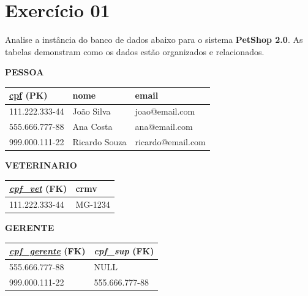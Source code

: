 \documentclass[12pt]{article}
\begin{document}
    
\vspace*{0.2cm}

\section*{Exercício 01}

Analise a instância do banco de dados abaixo para o sistema \textbf{PetShop 2.0}. As tabelas demonstram como os dados estão organizados e relacionados.

\begin{table}[H]
    \centering
    \small
    \textbf{PESSOA}\\
    \begin{tabular}{|l|l|l|}
    \hline
    \rowcolor{tableheader} \underline{cpf} (PK) & nome & email \\ \hline
    111.222.333-44 & João Silva & joao@email.com \\ \hline
    555.666.777-88 & Ana Costa & ana@email.com \\ \hline
    999.000.111-22 & Ricardo Souza & ricardo@email.com \\ \hline
    \end{tabular}

    \vspace{0.5cm}

    \begin{minipage}{0.45\textwidth}
        \centering
        \textbf{VETERINARIO}\\
        \begin{tabular}{|l|l|}
        \hline
        \rowcolor{tableheader} \underline{\textit{cpf\_vet}} (FK) & crmv \\ \hline
        111.222.333-44 & MG-1234 \\ \hline
        \end{tabular}
    \end{minipage}
    \begin{minipage}{0.45\textwidth}
        \centering
        \textbf{GERENTE}\\
        \begin{tabular}{|l|l|}
        \hline
        \rowcolor{tableheader} \underline{\textit{cpf\_gerente}} (FK) & \textit{cpf\_sup} (FK) \\ \hline
        555.666.777-88 & NULL \\ \hline
        999.000.111-22 & 555.666.777-88 \\ \hline
        \end{tabular}
    \end{minipage}


\end{table}
\end{document}
